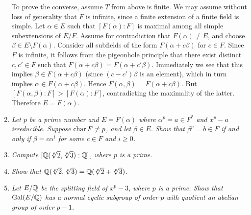 \documentclass[10pt]{article}
\begin{document}
\begin{enumerate}
To prove the converse, assume $T$ from above is finite.  We may assume without loss of generality that $F$ is infinite, since a finite extension of a finite field is simple.  Let $\alpha \in E$ such that $[F(\alpha):F]$ is maximal among all simple subextensions of $E/F$.  Assume for contradiction that $F(\alpha) \neq E$, and choose $\beta \in E \setminus F(\alpha)$.  Consider all subfields of the form $F(\alpha + c\beta)$ for $c \in F$.  Since $F$ is infinite, it follows from the pigeonhole principle that there exist distinct $c,c' \in F$ such that $F(\alpha + c\beta) = F(\alpha + c'\beta)$.  Immediately we see that this implies $\beta \in F(\alpha + c\beta)$ (since $(c-c')\beta$ is an element), which in turn implies $\alpha \in F(\alpha + c\beta)$.  Hence $F(\alpha, \beta) = F(\alpha + c\beta)$.  But $[F(\alpha, \beta):F] > [F(\alpha):F]$, contradicting the maximality of the latter.  Therefore $E = F(\alpha)$.

\item \emph{Let $p$ be a prime number and $E = F(\alpha)$ where $\alpha^p = a \in F^\ast$ and $x^p - a$ irreducible.  Suppose $\operatorname{char} F \neq p$, and let $\beta \in E$.  Show that $\beta^p = b \in F$ if and only if $\beta = c \alpha^i$ for some $c \in F$ and $i \geq 0$.}

\item \emph{Compute $[\mathbb{Q}(\sqrt[p]{2}, \sqrt[p]{3}): \mathbb{Q}]$, where $p$ is a prime.}

\item \emph{Show that $\mathbb{Q}(\sqrt[p]{2}, \sqrt[p]{3}) = \mathbb{Q}(\sqrt[p]{2} + \sqrt[p]{3})$.}

\item \emph{Let $E/\mathbb{Q}$ be the splitting field of $x^p - 3$, where $p$ is a prime.  Show that $\operatorname{Gal}(E/\mathbb{Q})$ has a normal cyclic subgroup of order $p$ with quotient an abelian group of order $p-1$.}
\end{enumerate}
\end{document}
